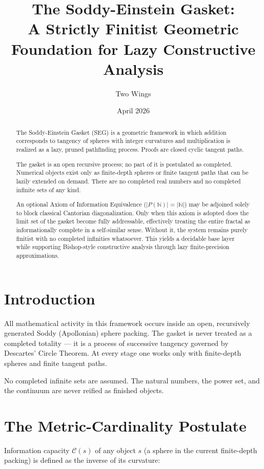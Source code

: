 \documentclass[11pt,oneside]{article}
\title{\textbf{The Soddy-Einstein Gasket: \\ A Strictly Finitist Geometric Foundation for Lazy Constructive Analysis}}
\author{Two Wings}
\date{April 2026}
\begin{document}
\maketitle

\begin{abstract}
The Soddy-Einstein Gasket (SEG) is a geometric framework in which addition corresponds to tangency of spheres with integer curvatures and multiplication is realized as a lazy, pruned pathfinding process. Proofs are closed cyclic tangent paths. 

The gasket is an open recursive process; no part of it is postulated as completed. Numerical objects exist only as finite-depth spheres or finite tangent paths that can be lazily extended on demand. There are no completed real numbers and no completed infinite sets of any kind. 

An optional Axiom of Information Equivalence (\( |P(\mathbb{N})| = |\mathbb{N}| \)) may be adjoined solely to block classical Cantorian diagonalization. Only when this axiom is adopted does the limit set of the gasket become fully addressable, effectively treating the entire fractal as informationally complete in a self-similar sense. Without it, the system remains purely finitist with no completed infinities whatsoever. This yields a decidable base layer while supporting Bishop-style constructive analysis through lazy finite-precision approximations.
\end{abstract}

\section{Introduction}
All mathematical activity in this framework occurs inside an open, recursively generated Soddy (Apollonian) sphere packing. The gasket is never treated as a completed totality — it is a process of successive tangency governed by Descartes' Circle Theorem. At every stage one works only with finite-depth spheres and finite tangent paths. 

No completed infinite sets are assumed. The natural numbers, the power set, and the continuum are never reified as finished objects.

\section{The Metric-Cardinality Postulate}
Information capacity \(\mathcal{C}(s)\) of any object \(s\) (a sphere in the current finite-depth packing) is defined as the inverse of its curvature:
\end{document}
